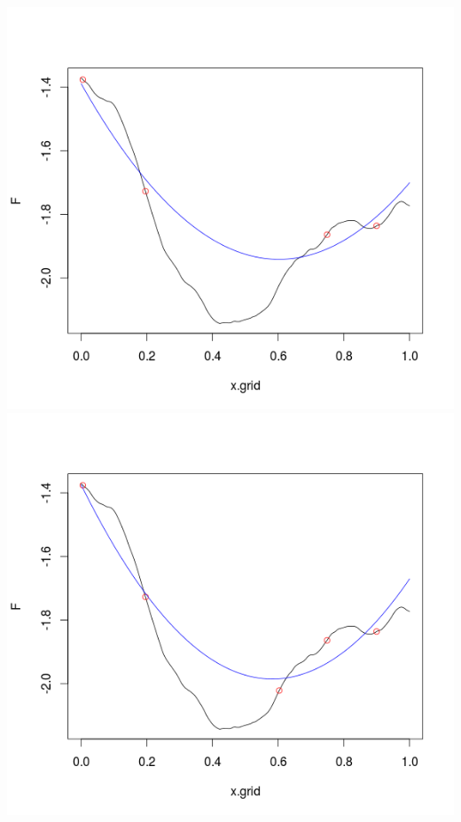 \documentclass{beamer}
\begin{document}
\begin{frame}
\includegraphics[trim = 10mm 20mm 10mm 10mm, clip, width=.37\paperwidth]{fig/prs1.png}
\includegraphics[trim = 10mm 20mm 10mm 10mm, clip, width=.37\paperwidth]{fig/prs2.png}
\end{frame}
\end{document}
